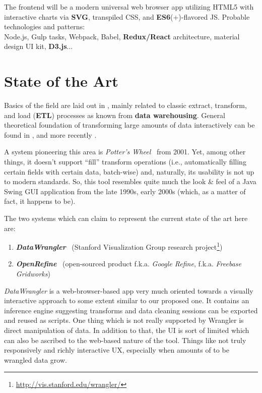 The frontend will be a modern universal web browser app utilizing HTML5 with interactive charts via \textbf{SVG}, transpiled CSS, and \textbf{ES6}(+)-flavored JS. Probable technologies and patterns:\\
Node.js, Gulp tasks, Webpack, Babel, \textbf{Redux/React} architecture, material design UI kit, \textbf{D3.js}...


\section{State of the Art}

Basics of the field are laid out in \cite{dasu2003exploratory}, mainly related to classic extract, transform, and load (\textbf{ETL}) processes as known from \textbf{data warehousing}. General theoretical foundation of transforming large amounts of data interactively can be found in \cite{Dasu:2002:MDS:564691.564719}, and more recently \cite{hellerstein_quantitative}.

A system pioneering this area is \textit{Potter's Wheel}~\cite{Raman2001a} from 2001. Yet, among other things, it doesn't support ``fill'' transform operations (i.e., automatically filling certain fields with certain data, batch-wise) and, naturally, its usability is not up to modern standards. So, this tool resembles quite much the look \& feel of a Java Swing GUI application from the late 1990s, early 2000s (which, as a matter of fact, it happens to be).

The two systems which can claim to represent the current state of the art here are:

\begin{enumerate}
  \item \textbf{\textit{DataWrangler}}~\cite{Kandel2011a} (Stanford Visualization Group research project\footnote{\href{http://vis.stanford.edu/wrangler/}{http://vis.stanford.edu/wrangler/}})
  \item \textbf{\textit{OpenRefine}}~\cite{web:OpenRefine} (open-sourced product f.k.a. \textit{Google Refine}, f.k.a. \textit{Freebase Gridworks})
\end{enumerate}

\textit{DataWrangler} is a web-browser-based app very much oriented towards a visually interactive approach to some extent similar to our proposed one. It contains an inference engine suggesting transforms and data cleaning sessions can be exported and reused as scripts. One thing which is not really supported by Wrangler is direct manipulation of data. In addition to that, the UI is sort of limited which can also be ascribed to the web-based nature of the tool. Things like not truly responsively and richly interactive UX, especially when amounts of to be wrangled data grow.

